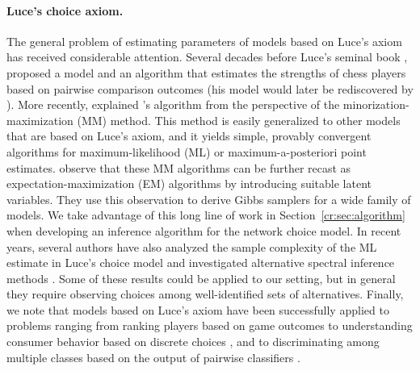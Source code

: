 \paragraph{Luce's choice axiom.}
The general problem of estimating parameters of models based on Luce's axiom has received considerable attention.
Several decades before Luce's seminal book \citep{luce1959individual}, \citet{zermelo1928berechnung} proposed a model and an algorithm that estimates the strengths of chess players based on pairwise comparison outcomes (his model would later be rediscovered by \citet{bradley1952rank}).
More recently, \citet{hunter2004mm} explained \citeauthor{zermelo1928berechnung}'s algorithm from the perspective of the minorization-maximization (MM) method.
This method is easily generalized to other models that are based on Luce's axiom, and it yields simple, provably convergent algorithms for maximum-likelihood (ML) or maximum-a-posteriori point estimates.
\citet{caron2012efficient} observe that these MM algorithms can be further recast as expectation-maximization (EM) algorithms by introducing suitable latent variables.
They use this observation to derive Gibbs samplers for a wide family of models.
We take advantage of this long line of work in Section~\ref{cr:sec:algorithm} when developing an inference algorithm for the network choice model.
In recent years, several authors have also analyzed the sample complexity of the ML estimate in Luce's choice model \citep{hajek2014minimax, vojnovic2016parameter} and investigated alternative spectral inference methods \citep{negahban2012iterative, azari2013generalized, maystre2015fast}.
Some of these results could be applied to our setting, but in general they require observing choices among well-identified sets of alternatives.
Finally, we note that models based on Luce's axiom have been successfully applied to problems ranging from ranking players based on game outcomes \citep{zermelo1928berechnung, elo1978rating} to understanding consumer behavior based on discrete choices \citep{mcfadden1973conditional}, and to discriminating among multiple classes based on the output of pairwise classifiers \citep{hastie1998classification}.

